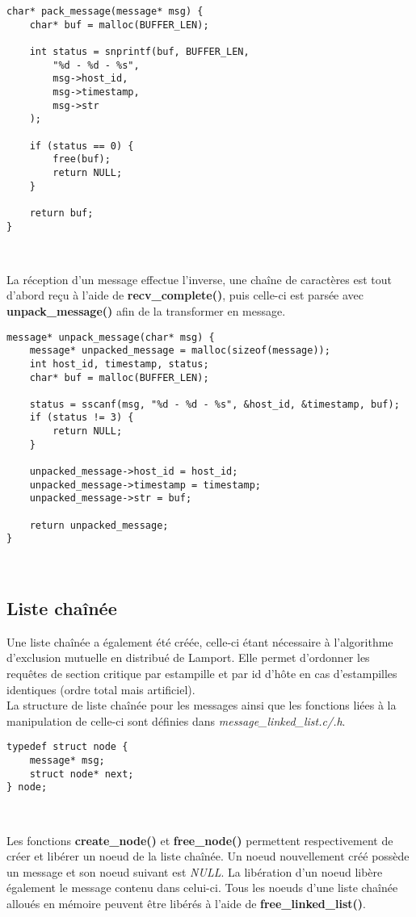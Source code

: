 \begin{lstlisting}
char* pack_message(message* msg) {
	char* buf = malloc(BUFFER_LEN);

	int status = snprintf(buf, BUFFER_LEN,
		"%d - %d - %s",
		msg->host_id,
		msg->timestamp,
		msg->str
	);

	if (status == 0) {
		free(buf);
		return NULL;
	}

	return buf;
}
\end{lstlisting}
\

La réception d'un message effectue l'inverse, une chaîne de caractères est tout d'abord reçu à l'aide de \textbf{recv\_complete()}, puis celle-ci est parsée avec \textbf{unpack\_message()} afin de la transformer en message.\\

\begin{lstlisting}
message* unpack_message(char* msg) {
	message* unpacked_message = malloc(sizeof(message));
	int host_id, timestamp, status;
	char* buf = malloc(BUFFER_LEN);

	status = sscanf(msg, "%d - %d - %s", &host_id, &timestamp, buf);
	if (status != 3) {
		return NULL;
	}

	unpacked_message->host_id = host_id;
	unpacked_message->timestamp = timestamp;
	unpacked_message->str = buf;

	return unpacked_message;
}
\end{lstlisting}
\

\subsection{Liste chaînée}
Une liste chaînée a également été créée, celle-ci étant nécessaire à l'algorithme d'exclusion mutuelle en distribué de Lamport. Elle permet d'ordonner les requêtes de section critique par estampille et par id d'hôte en cas d'estampilles identiques (ordre total mais artificiel).\\

La structure de liste chaînée pour les messages ainsi que les fonctions liées à la manipulation de celle-ci sont définies dans \emph{message\_linked\_list.c/.h}.

\begin{lstlisting}[caption=Structure de noeud de la liste chaînée]
typedef struct node {
    message* msg;
    struct node* next;
} node;
\end{lstlisting}
\

Les fonctions \textbf{create\_node()} et \textbf{free\_node()} permettent respectivement de créer et libérer un noeud de la liste chaînée. Un noeud nouvellement créé possède un message et son noeud suivant est \emph{NULL}. La libération d'un noeud libère également le message contenu dans celui-ci. Tous les noeuds d'une liste chaînée alloués en mémoire peuvent être libérés à l'aide de \textbf{free\_linked\_list()}.\\

